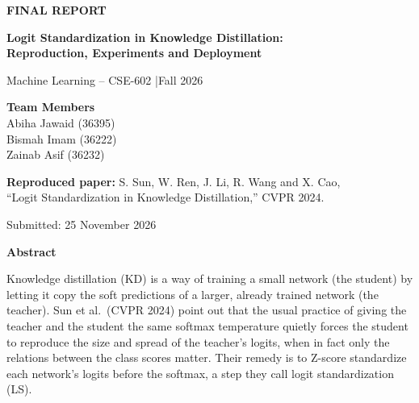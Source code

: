 \documentclass[12pt,a4paper]{article}
\begin{document}
\begin{titlepage}\thispagestyle{empty}
    \centering
    \vspace*{1.2cm}
    {\Large \textbf{FINAL REPORT}\par}
    \vspace{1cm}
    {\LARGE \textbf{Logit Standardization in Knowledge Distillation:\\[4pt]Reproduction, Experiments and Deployment}\par}
    \vspace{1cm}
    {\large Machine Learning -- CSE-602 \quad|\quad Fall 2026\par}
    \vspace{1cm}
    \textbf{Team Members}\\[6pt]
    Abiha Jawaid (36395)\\
    Bismah Imam (36222)\\
    Zainab Asif (36232)
    \vspace{1cm}

    \textbf{Reproduced paper:} S. Sun, W. Ren, J. Li, R. Wang and X. Cao,\\
    ``Logit Standardization in Knowledge Distillation,'' CVPR 2024.
    \vspace{1cm}

    \vfill
    {\large Submitted: 25 November 2026\par}
\end{titlepage}

\setcounter{page}{2}
\begin{center}{\fontsize{16}{19}\bfseries Abstract}\end{center}

Knowledge distillation (KD) is a way of training a small network (the student) by letting it copy the soft predictions of a larger, already trained network (the teacher). Sun et al.\ (CVPR 2024) point out that the usual practice of giving the teacher and the student the same softmax temperature quietly forces the student to reproduce the size and spread of the teacher's logits, when in fact only the relations between the class scores matter. Their remedy is to Z-score standardize each network's logits before the softmax, a step they call logit standardization (LS).
\end{document}

